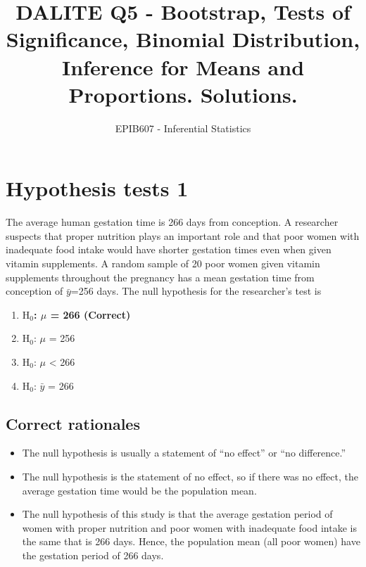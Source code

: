 \documentclass[letterpaper,9pt,twoside,printwatermark=false]{pinp}
\title{DALITE Q5 - Bootstrap, Tests of Significance, Binomial Distribution,
Inference for Means and Proportions. Solutions.}
\author[a]{EPIB607 - Inferential Statistics}
\affil[a]{Fall 2019, McGill University}
\providecommand{\tightlist}{%
  \setlength{\itemsep}{0pt}\setlength{\parskip}{0pt}}
\begin{document}
\verticaladjustment{-2pt}

\maketitle
\thispagestyle{firststyle}



\hypertarget{hypothesis-tests-1}{%
\section{Hypothesis tests 1}\label{hypothesis-tests-1}}

The average human gestation time is 266 days from conception. A
researcher suspects that proper nutrition plays an important role and
that poor women with inadequate food intake would have shorter gestation
times even when given vitamin supplements. A random sample of 20 poor
women given vitamin supplements throughout the pregnancy has a mean
gestation time from conception of \(\bar{y}\)=256 days. The null
hypothesis for the researcher's test is

\begin{enumerate}
\def\labelenumi{\alph{enumi}.}
\tightlist
\item
  \textbf{\(\textrm{H}_0\): \(\mu\) = 266 (Correct)}
\item
  \(\textrm{H}_0\): \(\mu\) = 256
\item
  \(\textrm{H}_0\): \(\mu\) \textless{} 266
\item
  \(\textrm{H}_0\): \(\bar{y}\) = 266
\end{enumerate}

\hypertarget{correct-rationales}{%
\subsection{Correct rationales}\label{correct-rationales}}

\begin{itemize}
\tightlist
\item
  The null hypothesis is usually a statement of ``no effect'' or ``no
  difference.''
\item
  The null hypothesis is the statement of no effect, so if there was no
  effect, the average gestation time would be the population mean.
\item
  The null hypothesis of this study is that the average gestation period
  of women with proper nutrition and poor women with inadequate food
  intake is the same that is 266 days. Hence, the population mean (all
  poor women) have the gestation period of 266 days.
\end{itemize}
\end{document}
